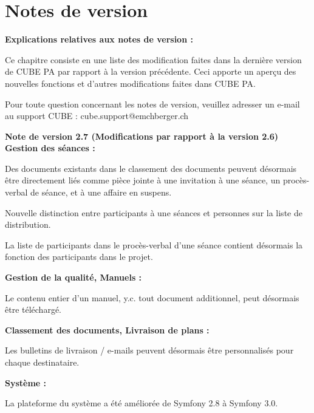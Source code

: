 
\clearpage
\section{Notes de version}

\textbf{Explications relatives aux notes de version :}

\vspace{\baselineskip}

Ce chapitre consiste en une liste des modification faites dans la dernière version de CUBE PA par rapport à la version précédente. Ceci apporte un aperçu des nouvelles fonctions et d'autres modifications faites dans CUBE PA.

\vspace{\baselineskip}

Pour toute question concernant les notes de version, veuillez adresser un e-mail au support CUBE : {\color{red} cube.support@emchberger.ch}

\vspace{\baselineskip}


\textbf{Note de version 2.7 (Modifications par rapport à la version 2.6)} \\
\textbf{Gestion des séances :}
\begin{compactitem}
  \item Des documents existants dans le classement des documents peuvent désormais être directement liés comme pièce jointe à une invitation à une séance, un procès-verbal de séance, et à une affaire en suspens.
	\item Nouvelle distinction entre participants à une séances et personnes sur la liste de distribution.
	\item La liste de participants dans le procès-verbal d'une séance contient désormais la fonction des participants dans le projet.
\end{compactitem}
\textbf{Gestion de la qualité, Manuels :}
\begin{compactitem}
  \item Le contenu entier d'un manuel, y.c. tout document additionnel, peut désormais être téléchargé.
\end{compactitem}
\textbf{Classement des documents, Livraison de plans :}
\begin{compactitem}
  \item Les bulletins de livraison / e-mails peuvent désormais être personnalisés pour chaque destinataire.
\end{compactitem}
\textbf{Système :}
\begin{compactitem}
  \item La plateforme du système a été améliorée de Symfony 2.8 à Symfony 3.0.
\end{compactitem}
 
